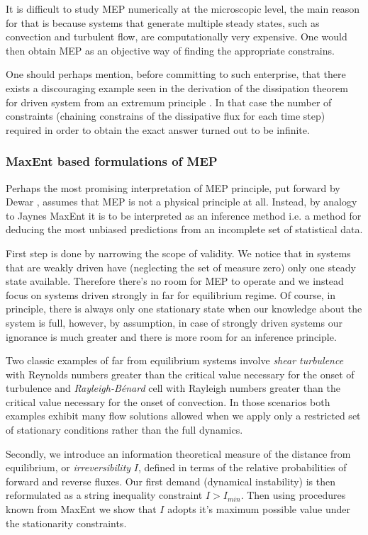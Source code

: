 \documentclass[a4paper,12pt]{article}
\begin{document}
It is difficult to study MEP numerically at the microscopic level, the main reason for that is because systems that generate multiple steady states, such as convection and turbulent flow, are computationally very expensive. One would then obtain MEP as an objective way of finding the appropriate constrains.

One should perhaps mention, before committing to such enterprise, that there exists a discouraging example seen in the derivation of the dissipation theorem for driven system from an extremum principle \cite{Evans:1985br}. In that case the number of constraints (chaining constrains of the dissipative flux for each time step) required in order to obtain the exact answer turned out to be infinite. 

\subsubsection{MaxEnt based formulations of MEP}

Perhaps the most promising interpretation of MEP principle, put forward by Dewar %
, assumes that MEP is not a physical principle at all. Instead, by analogy to Jaynes MaxEnt it is to be interpreted as an inference method i.e. a method for deducing the most unbiased predictions from an incomplete set of statistical data. 

First step is done by narrowing the scope of validity. We notice that in systems that are weakly driven have (neglecting the set of measure zero) only one steady state available. Therefore there's no room for MEP to operate and we instead focus on systems driven strongly in far for equilibrium regime. Of course, in principle, there is always only one stationary state when our knowledge about the system is full, however, by assumption, in case of strongly driven systems our ignorance is much greater and there is more room for an inference principle. 

Two classic examples of far from equilibrium systems involve \textit{shear turbulence} with Reynolds numbers greater than the critical value necessary for the onset of turbulence and \textit{Rayleigh-Bénard} cell with Rayleigh numbers greater than the critical value necessary for the onset of convection.
In those scenarios both examples exhibit many flow solutions allowed when we apply only a restricted set of stationary conditions rather than the full dynamics.

Secondly, we introduce an information theoretical measure of the distance from equilibrium, or \textit{irreversibility} $I$, defined in terms of the relative probabilities of forward and reverse fluxes. 
Our first demand (dynamical instability) is then reformulated as a string inequality constraint $I>I_{min}$. 
Then using procedures known from MaxEnt we show that $I$ adopts it's maximum possible value under the stationarity constraints.
\end{document}
